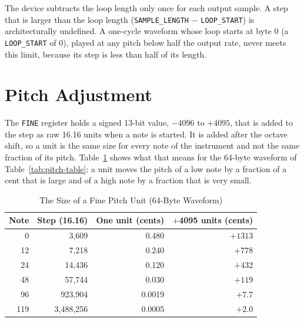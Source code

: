 The device subtracts the loop length only once for each output sample. A step that is larger than the loop length
(\texttt{SAMPLE\_LENGTH} $-$ \texttt{LOOP\_START}) is architecturally undefined. A one-cycle waveform whose loop starts
at byte 0 (a \texttt{LOOP\_START} of 0), played at any pitch below half the output rate, never meets this limit,
because its step is less than half of its length.

\section{Pitch Adjustment}
\label{sec:fine-pitch}

The \texttt{FINE} register holds a signed 13-bit value, $-4096$ to $+4095$, that is added to the step as raw 16.16
units when a note is started. It is added after the octave shift, so a unit is the same size for every note of the
instrument and not the same fraction of its pitch. Table~\ref{tab:fine-units} shows what that means for the 64-byte
waveform of Table~\ref{tab:pitch-table}: a unit moves the pitch of a low note by a fraction of a cent that is large and
of a high note by a fraction that is very small.

\begin{table}[H]
	\centering
	\begin{tabular}{rrrr}
		\toprule
		\textbf{Note} & \textbf{Step (16.16)} & \textbf{One unit (cents)} & \textbf{$+$4095 units (cents)} \\
		\midrule
		0             & 3,609                 & 0.480                     & $+1313$                        \\
		12            & 7,218                 & 0.240                     & $+778$                         \\
		24            & 14,436                & 0.120                     & $+432$                         \\
		48            & 57,744                & 0.030                     & $+119$                         \\
		96            & 923,904               & 0.0019                    & $+7.7$                         \\
		119           & 3,488,256             & 0.0005                    & $+2.0$                         \\
		\bottomrule
	\end{tabular}
	\caption{The Size of a Fine Pitch Unit (64-Byte Waveform)}
	\label{tab:fine-units}
\end{table}

